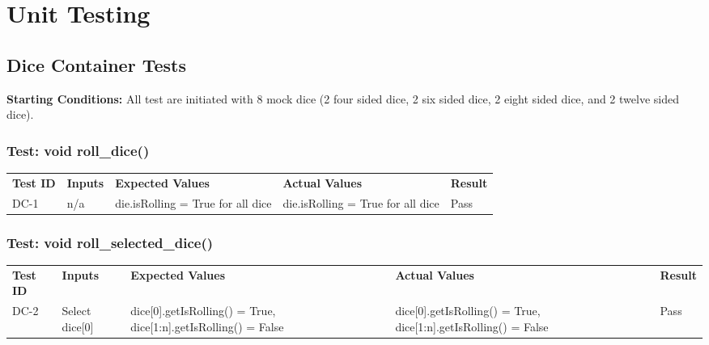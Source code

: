 \documentclass[12pt, titlepage]{article}
\begin{document}

\newpage
\section{Unit Testing}

\subsection{Dice Container Tests}

\textbf{Starting Conditions:} All test are initiated with 8 mock dice (2 four sided dice, 2 six sided dice, 2 eight sided dice, and 2 twelve sided dice).

\subsubsection{Test: void roll\_dice()}
\begin{tabularx}{\textwidth}{|p{2cm}|p{3.5cm}|p{4cm}|p{4cm}|p{1.5cm}|}
    \cline{1-5}
    \textbf{Test ID} & \textbf{Inputs} & \textbf{Expected Values} & \textbf{Actual Values} & \textbf{Result} \\
    \cline{1-5}
    DC-1 & n/a & die.isRolling = True for all dice & die.isRolling = True for all dice & Pass \\
    \cline{1-5}
\end{tabularx}

\subsubsection{Test: void roll\_selected\_dice()}
\begin{tabularx}{\textwidth}{|p{2cm}|p{3.5cm}|p{4cm}|p{4cm}|p{1.5cm}|}
    \cline{1-5}
    \textbf{Test ID} & \textbf{Inputs} & \textbf{Expected Values} & \textbf{Actual Values} & \textbf{Result} \\
    \cline{1-5}
    DC-2 & Select dice[0] & dice[0].getIsRolling() = True, dice[1:n].getIsRolling() = False & dice[0].getIsRolling() = True, dice[1:n].getIsRolling() = False & Pass \\
    \cline{1-5}
\end{tabularx}
\end{document}
